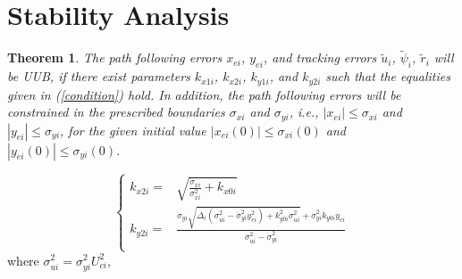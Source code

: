 \documentclass[english]{cccconf}
\newtheorem{theorem}{Theorem}
\begin{document}
\section{Stability Analysis}

\begin{theorem}
The path following errors $x_{ei}$, $y_{ei}$, and tracking errors $\tilde{u}_i$, $\tilde{\psi}_i$, $\tilde{r}_i$ will be UUB, if there exist parameters $k_{x1i}$, $k_{x2i}$, $k_{y1i}$, and $k_{y2i}$ such that the equalities given in (\ref{condition}) hold. In addition, the path following errors will be constrained in the prescribed boundaries $\sigma_{xi}$ and $\sigma_{yi}$, i.e., $\left|x_{ei}\right|\leq \sigma_{xi}$ and $\left|y_{ei}\right|\leq \sigma_{yi}$,  for the given initial value $\left|x_{ei}(0)\right|\leq \sigma_{xi}(0)$ and $\left|y_{ei}(0)\right|\leq \sigma_{yi}(0)$. \end{theorem}

\begin{equation}\label{condition}
	\left\{
	\begin{aligned}
		k_{x2i}=&\sqrt{\frac{\dot{\sigma}_{xi}}{\sigma_{xi}^2}+k_{x0i}}\\
		k_{y2i}=&\frac{\dot{\sigma}_{yi}\sqrt{\Delta_i(\sigma^2_{ui}-\dot{\sigma}^2_{yi}y^2_{ei})+k^2_{y0i}\sigma^2_{ui}}+\dot{\sigma}^2_{yi}k_{y0i}y_{ei}}{\sigma^2_{ui}-\dot{\sigma}^2_{yi}}\\
	\end{aligned}
	\right.
\end{equation} 
where $\sigma^2_{ui}=\sigma^2_{yi}U^2_{ci}$, 
\end{document}
